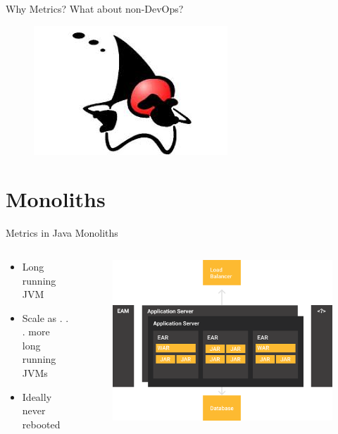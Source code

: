 \documentclass{beamer}
\begin{document}
\begin{frame}{Why Metrics?}
\Large What about non-DevOps?
\begin{figure}
	\centering
	\includegraphics[width=0.6\linewidth]{Images/dukewhy}
\end{figure}
\end{frame}

\section{Monoliths}
\begin{frame}{Metrics in Java Monoliths}
\begin{columns}[T] %
	\begin{column}[T]{3cm} %
		\begin{itemize}
			\item Long running JVM
			\item Scale as . . . more long running JVMs
			\item Ideally never rebooted
		\end{itemize}
	\end{column}
	\begin{column}[T]{7cm} %
		\begin{figure}
			\centering
			\includegraphics[width=\linewidth]{Images/monolitos}
		\end{figure}
		
	\end{column}
\end{columns}
\end{frame}
\end{document}
